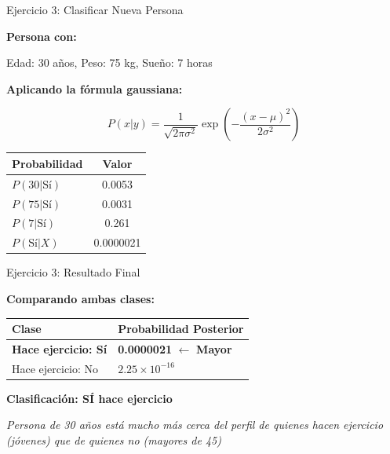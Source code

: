 \documentclass{beamer}
\begin{document}
\begin{frame}{Ejercicio 3: Clasificar Nueva Persona}
    \begin{center}
        \textbf{Persona con:}

        Edad: 30 años, Peso: 75 kg, Sueño: 7 horas

        \textbf{Aplicando la fórmula gaussiana:}

        \[
        P(x|y) = \frac{1}{\sqrt{2\pi\sigma^2}} \exp\left(-\frac{(x-\mu)^2}{2\sigma^2}\right)
        \]

        \begin{tabular}{lc}
            \toprule
            \textbf{Probabilidad} & \textbf{Valor} \\
            \midrule
            $P(30|\text{Sí})$ & 0.0053 \\
            $P(75|\text{Sí})$ & 0.0031 \\
            $P(7|\text{Sí})$ & 0.261 \\
            \midrule
            $P(\text{Sí}|X)$ & 0.0000021 \\
            \bottomrule
        \end{tabular}
    \end{center}
\end{frame}

\begin{frame}{Ejercicio 3: Resultado Final}
    \begin{center}
        \textbf{Comparando ambas clases:}

        \vspace{0.8cm}

        \begin{tabular}{ll}
            \toprule
            \textbf{Clase} & \textbf{Probabilidad Posterior} \\
            \midrule
            \textcolor{primary}{\textbf{Hace ejercicio: Sí}} & \textcolor{primary}{\textbf{0.0000021}} $\leftarrow$ \textbf{Mayor} \\
            Hace ejercicio: No & $2.25 \times 10^{-16}$ \\
            \bottomrule
        \end{tabular}

        \vspace{0.8cm}

        \Large{\textbf{Clasificación: SÍ hace ejercicio}}

        \vspace{0.5cm}

        \normalsize{\textit{Persona de 30 años está mucho más cerca del perfil de quienes hacen ejercicio (jóvenes) que de quienes no (mayores de 45)}}
    \end{center}
\end{frame}
\end{document}
